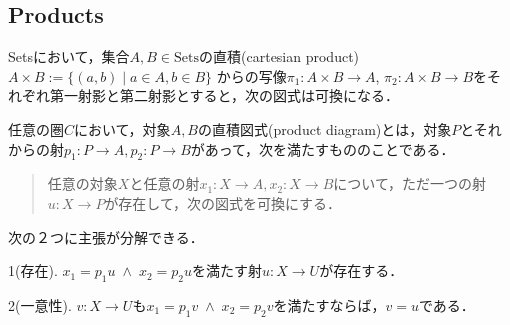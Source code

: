 \documentclass[uplatex, 12pt, dvipdfmx]{jsarticle}
\begin{document}
\clearpage

\subsection{Products}

\begin{proposition*}
    Setsにおいて，集合$A,B\in\mathrm{Sets}$の直積(cartesian product) $A\times B:=\{ (a,b)\mid a\in A,b\in B \}$
    からの写像$\pi_1:A\times B\to A$, $\pi_2:A\times B\to B$をそれぞれ第一射影と第二射影とすると，次の図式は可換になる．
    \begin{center}
    \end{center}
\end{proposition*}

\vspace{3cm}

\begin{definition}
    任意の圏$C$において，対象$A,B$の直積図式(product diagram)とは，対象$P$とそれからの射$p_1:P\to A, p_2:P\to B$があって，次を満たすもののことである．
\begin{quote}
    任意の対象$X$と任意の射$x_1:X\to A, x_2:X\to B$について，ただ一つの射$u:X\to P$が存在して，次の図式を可換にする．
\end{quote}
    \begin{center}
    \end{center}
\end{definition}
\vspace{3cm}
\begin{remark}
    次の２つに主張が分解できる．

    1(存在). $x_1=p_1u\;\land\; x_2=p_2u$を満たす射$u:X\to U$が存在する．

    2(一意性). $v:X\to U$も$x_1=p_1v\;\land\; x_2=p_2v$を満たすならば，$v=u$である．
\end{remark}
\vspace{1cm}
\end{document}
